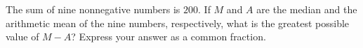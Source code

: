 The sum of nine nonnegative numbers is $200$. If $M$ and $A$ are the median and the arithmetic mean of the nine numbers, respectively, what is the greatest possible value of $M-A$? Express your answer as a common fraction.
